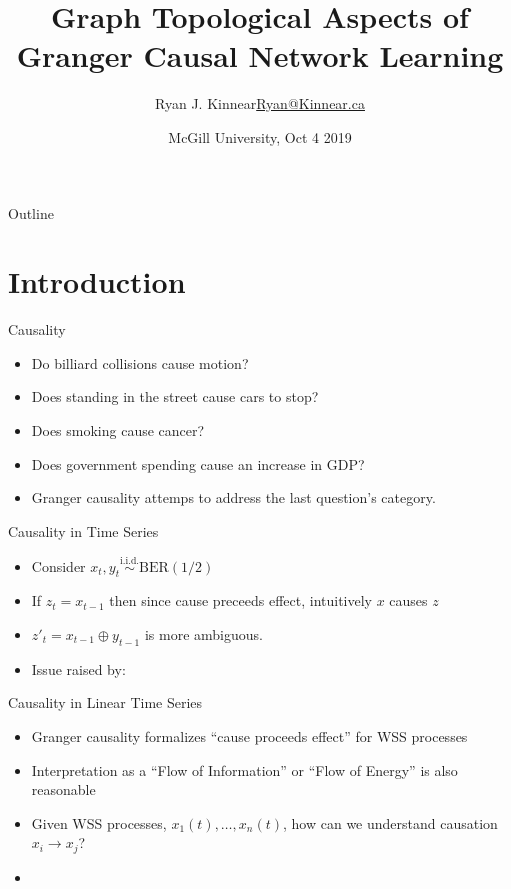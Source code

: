 \documentclass{beamer} %
\title{Graph Topological Aspects of Granger Causal Network Learning}
\author{\texorpdfstring{Ryan J. Kinnear\newline\url{Ryan@Kinnear.ca}}{Ryan J. Kinnear}}%
\institute[University of Waterloo] %
{
  University of Waterloo\\
  Department of Electrical and Computer Engineering
}
\date{McGill University, Oct 4 2019}
\begin{document}
\begin{frame}
  \titlepage
\end{frame}

\begin{frame}{Outline}
  \tableofcontents
\end{frame}

\section{Introduction}

\begin{frame}{Causality}
  \begin{itemize}
    \item{Do billiard collisions cause motion?}\pause
    \item{Does standing in the street cause cars to stop?}\pause
    \item{Does smoking cause cancer?}\pause
    \item{Does government spending cause an increase in GDP?}\pause
    \item{Granger causality attemps to address the last question's category.}
  \end{itemize}
\end{frame}

\begin{frame}{Causality in Time Series}
  \begin{itemize}
    \item{Consider $x_t, y_t \overset{\text{i.i.d.}}{\sim} \text{BER}(1/2)$}\pause
    \item{If $z_t = x_{t - 1}$ then since cause preceeds effect, intuitively $x$ causes $z$}\pause
    \item{$z'_t = x_{t - 1} \oplus y_{t - 1}$ is more ambiguous.}\pause
    \item{Issue raised by: } 
  \end{itemize}
\end{frame}

\begin{frame}{Causality in Linear Time Series}
  \begin{itemize}
    \item{Granger causality formalizes ``cause proceeds effect'' for WSS processes}\pause
    \item{Interpretation as a ``Flow of Information'' or ``Flow of Energy'' is also reasonable}\pause
    \item{Given WSS processes, $x_1(t), \ldots, x_n(t)$, how can we understand causation $x_i \rightarrow x_j$?}\pause
    \item{}
  \end{itemize}
\end{frame}
\end{document}
